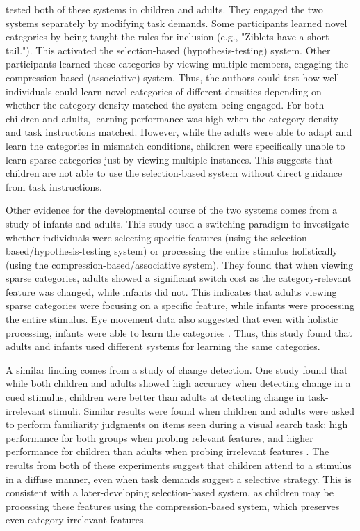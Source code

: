 \documentclass[../dissertation.tex]{subfiles}
\begin{document}
	\citet{Kloos2008} tested both of these systems in children and adults. They engaged the two systems separately by modifying task demands. Some participants learned novel categories by being taught the rules for inclusion (e.g., "Ziblets have a short tail."). This activated the selection-based (hypothesis-testing) system. Other participants learned these categories by viewing multiple members, engaging the compression-based (associative) system. Thus, the authors could test how well individuals could learn novel categories of different densities depending on whether the category density matched the system being engaged. For both children and adults, learning performance was high when the category density and task instructions matched. However, while the adults were able to adapt and learn the categories in mismatch conditions, children were specifically unable to learn sparse categories just by viewing multiple instances. This suggests that children are not able to use the selection-based system without direct guidance from task instructions. \par
	Other evidence for the developmental course of the two systems comes from a study of infants and adults. This study used a switching paradigm to investigate whether individuals were selecting specific features (using the selection-based/hypothesis-testing system) or processing the entire stimulus holistically (using the compression-based/associative system). They found that when viewing sparse categories, adults showed a significant switch cost as the category-relevant feature was changed, while infants did not. This indicates that adults viewing sparse categories were focusing on a specific feature, while infants were processing the entire stimulus. Eye movement data also suggested that even with holistic processing, infants were able to learn the categories \citep{Best2013}. Thus, this study found that adults and infants used different systems for learning the same categories. \par
	A similar finding comes from a study of change detection. One study found that while both children and adults showed high accuracy when detecting change in a cued stimulus, children were better than adults at detecting change in task-irrelevant stimuli. Similar results were found when children and adults were asked to perform familiarity judgments on items seen during a visual search task: high performance for both groups when probing relevant features, and higher performance for children than adults when probing irrelevant features \citep{Plebanek2017}. The results from both of these experiments suggest that children attend to a stimulus in a diffuse manner, even when task demands suggest a selective strategy. This is consistent with a later-developing selection-based system, as children may be processing these features using the compression-based system, which preserves even category-irrelevant features. \par
\end{document}
